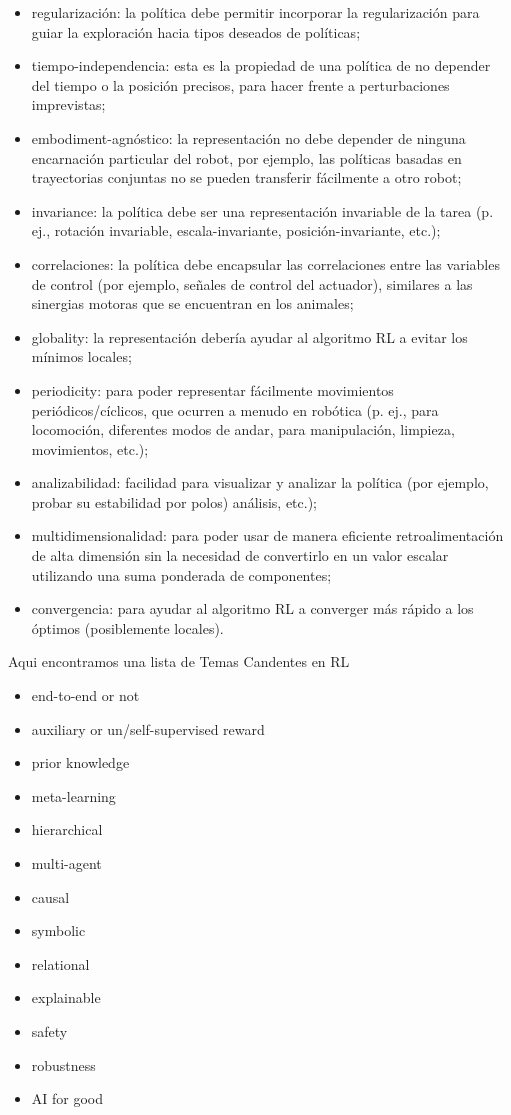 \documentclass{svproc}
\begin{document}
\begin{itemize}
    \item regularización: la política debe permitir incorporar la regularización para guiar la exploración hacia tipos deseados de políticas;
    \item tiempo-independencia: esta es la propiedad de una política de no depender del tiempo o la posición precisos, para hacer frente a perturbaciones imprevistas;
    \item embodiment-agnóstico: la representación no debe depender de ninguna encarnación particular del robot, por ejemplo, las políticas basadas en trayectorias conjuntas no se pueden transferir fácilmente a otro robot;
    \item invariance: la política debe ser una representación invariable de la tarea (p. ej., rotación invariable, escala-invariante, posición-invariante, etc.);
    \item correlaciones: la política debe encapsular las correlaciones entre las variables de control (por ejemplo, señales de control del actuador), similares a las sinergias motoras que se encuentran en los animales;
    \item globality: la representación debería ayudar al algoritmo RL a evitar los mínimos locales;
     \item periodicity: para poder representar fácilmente movimientos periódicos/cíclicos, que ocurren a menudo en robótica (p. ej., para locomoción, diferentes modos de andar, para manipulación, limpieza,  movimientos, etc.);
    \item analizabilidad: facilidad para visualizar y analizar la política (por ejemplo, probar su estabilidad por polos) análisis, etc.);
        \item multidimensionalidad: para poder usar de manera eficiente retroalimentación de alta dimensión sin la necesidad de convertirlo en un valor escalar utilizando una suma ponderada de componentes;
    \item convergencia: para ayudar al algoritmo RL a converger más rápido a los óptimos (posiblemente locales).

       
\end{itemize}

Aqui encontramos una lista de Temas Candentes en RL

\begin{itemize}
    \item end-to-end  or  not
    \item auxiliary  or  un/self-supervised  reward
    \item prior  knowledge
    \item meta-learning
    \item hierarchical
    \item multi-agent
    \item causal
    \item symbolic
    \item relational
    \item explainable
    \item safety
    \item robustness
    \item AI for good
\end{itemize} 
\end{document}
